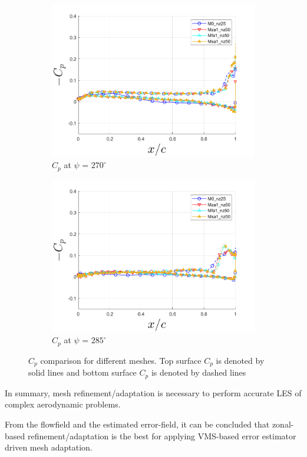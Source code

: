 \begin{figure}[H]
\begin{subfigure}[b]{0.475\textwidth}
\includegraphics[width=1\textwidth]{figures/Results/Cp_plots/Cp_ph_270.png}
\caption{ $C_p$ at $\psi$ = $270^\circ$}
\label{fig:Cp_270}
\end{subfigure}
\begin{subfigure}[b]{0.475\textwidth}
\centering
\includegraphics[width=1\textwidth]{figures/Results/Cp_plots/Cp_ph_285.png}
\caption{ $C_p$ at $\psi$ = $285^\circ$}
\label{fig:Cp_285}
\end{subfigure}
\caption{$C_p$ comparison for different meshes. Top surface $C_p$ is denoted by solid lines and bottom surface $C_p$ is denoted by dashed lines}
\label{fig:Cp_plots}
\end{figure}

In summary, mesh refinement/adaptation is necessary to perform accurate LES of complex aerodynamic problems.

From the flowfield and the estimated error-field, it can be concluded that zonal-based refinement/adaptation is the best for applying VMS-based error estimator driven mesh adaptation.